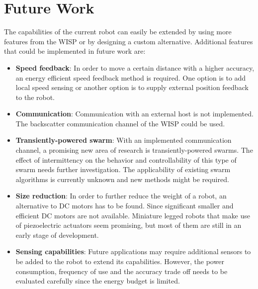 \section{Future Work}
\label{sec:limitations_future_work}

The capabilities of the current robot can easily be extended by using more features from the WISP or by designing a custom alternative.
Additional features that could be implemented in future work are:

\begin{itemize}

\item \textbf{Speed feedback}: 
In order to move a certain distance with a higher accuracy, an energy efficient speed feedback method is required.
One option is to add local speed sensing or another option is to supply external position feedback to the robot.


\item \textbf{Communication}: 
Communication with an external host is not implemented.
The backscatter communication channel of the WISP could be used.

\item \textbf{Transiently-powered swarm}: 
With an implemented communication channel, a promising new area of research is transiently-powered swarms.
The effect of intermittency on the behavior and controllability of this type of swarm needs further investigation.
The applicability of existing swarm algorithms is currently unknown and new methods might be required.	

\item \textbf{Size reduction}: 
In order to further reduce the weight of a robot, an alternative to DC motors has to be found.
Since significant smaller and efficient DC motors are not available.
Miniature legged robots that make use of piezoelectric actuators seem promising, but most of them are still in an early stage of development.

\item \textbf{Sensing capabilities}: 
Future applications may require additional sensors to be added to the robot to extend its capabilities.
However, the power consumption, frequency of use and the accuracy trade off needs to be evaluated carefully since the energy budget is limited.


\end{itemize}


